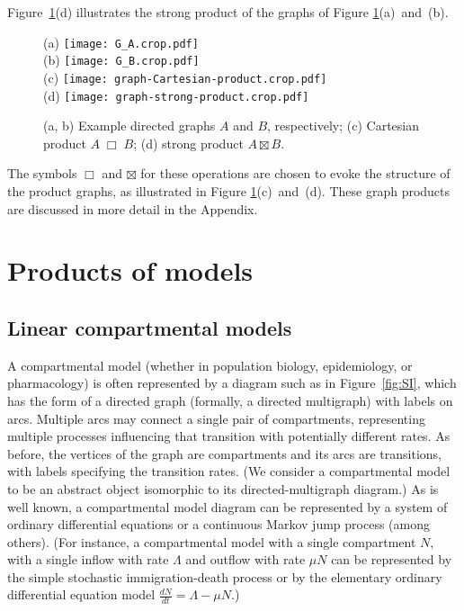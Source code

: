 \documentclass[review]{elsarticle}
\newcommand{\hl}[1]{#1}
\newcommand{\cartprod}{\;\Box\;}
\begin{document}
\hl{Figure~\mbox{\ref{fig:graph-products}}(d)} illustrates
the strong product of the graphs of
\hl{Figure \mbox{\ref{fig:graph-products}}(a)~and~(b)}.



\begin{figure}
\centering
(a) %
\texttt{[image: G\_A.crop.pdf]}
%
\\
(b) %
\texttt{[image: G\_B.crop.pdf]}
%
\\
(c) %
\texttt{[image: graph-Cartesian-product.crop.pdf]}
%
\\
(d) %
\texttt{[image: graph-strong-product.crop.pdf]}
%
\caption{ \label{fig:graph-products}
(a, b) Example directed graphs $A$ and $B$, respectively;
(c) Cartesian product $A\cartprod B$;
(d) strong product $A\boxtimes B$.
}
\end{figure}
The symbols $\Box$ and $\boxtimes$ for these operations
are chosen to evoke the structure of the product graphs,
as illustrated in
\hl{Figure \mbox{\ref{fig:graph-products}}(c)~and~(d)}.
These graph products are discussed in more detail in the Appendix.

\section{Products of models}

\subsection{Linear compartmental models}

A compartmental model (whether in 
population biology, epidemiology, or pharmacology) is often represented by a
diagram such as in \hl{Figure~\mbox{\ref{fig:SI}}}, which has the form of 
a directed graph (formally, a directed multigraph) with labels on arcs.
Multiple arcs may connect
a single pair of compartments, representing multiple
processes influencing that transition with potentially
different rates.
As before, the vertices of the graph are compartments and its arcs are
transitions, with labels specifying the transition rates.
(We consider a compartmental model to be an abstract object
isomorphic to its directed-multigraph diagram.)
As is well known, a compartmental model diagram can
be represented by a system of ordinary differential equations or a 
continuous Markov jump process (among others).
(For instance, a compartmental
model with a single compartment $N$, with a single inflow with
rate $\Lambda$ and outflow with rate $\mu N$ can be represented by
the simple stochastic immigration-death process \cite{baileystoch}
or by
the elementary ordinary differential equation model $\frac{dN}{dt} = \Lambda - \mu N$.)
\end{document}
